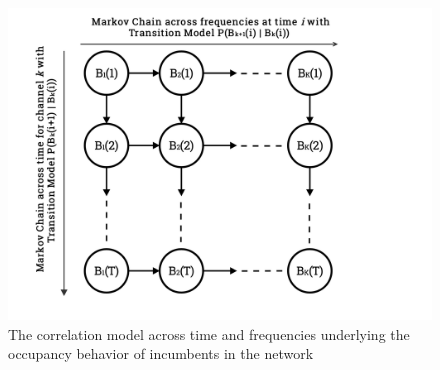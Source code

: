 \documentclass[10pt,twocolumn]{IEEEtran}
\begin{document}
\begin{figure}
    \centering
    \includegraphics[width=0.95\linewidth]{MarkovChainsVisualization}
    \vspace{-5mm}
    \caption{The correlation model across time and frequencies underlying the occupancy behavior of incumbents in the network}
    \vspace{-5mm}
    \label{fig:1}
\end{figure}
\end{document}
